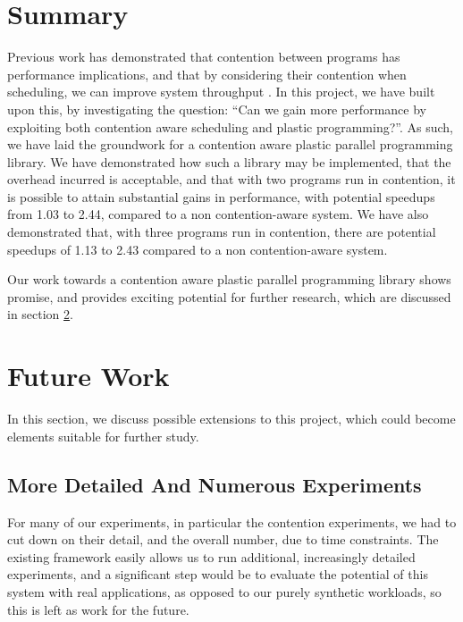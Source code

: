 
\section{Summary}
\label{section:conclusion_and_future_work:conclusion}

Previous work has demonstrated that contention between programs has performance implications, and that by considering their contention when scheduling, we can improve system throughput \cite{lira}. In this project, we have built upon this, by investigating the question: ``Can we gain more performance by exploiting both contention aware scheduling and plastic programming?''. As such, we have laid the groundwork for a contention aware plastic parallel programming library. We have demonstrated how such a library may be implemented, that the overhead incurred is acceptable, and that with two programs run in contention, it is possible to attain substantial gains in performance, with potential speedups from 1.03 to 2.44, compared to a non contention-aware system. We have also demonstrated that, with three programs run in contention, there are potential speedups of 1.13 to 2.43 compared to a non contention-aware system.

Our work towards a contention aware plastic parallel programming library shows promise, and provides exciting potential for further research, which are discussed in section \ref{section:conclusion_and_future_work:future_work}.





\section{Future Work}
\label{section:conclusion_and_future_work:future_work}

In this section, we discuss possible extensions to this project, which could become elements suitable for further study.



\subsection{More Detailed And Numerous Experiments}
\label{section:conclusion_and_future_work:more_detailed_and_numerous_experiments}

For many of our experiments, in particular the contention experiments, we had to cut down on their detail, and the overall number, due to time constraints. The existing framework easily allows us to run additional, increasingly detailed experiments, and a significant step would be to evaluate the potential of this system with real applications, as opposed to our purely synthetic workloads, so this is left as work for the future.



